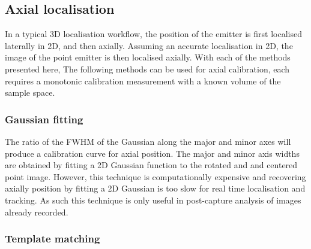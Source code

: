 \subsection{Axial localisation}

In a typical \gls{3D} localisation workflow, the position of the emitter is first localised laterally in \gls{2D}, and then axially.
Assuming an accurate localisation in 2D, the image of the point emitter is then localised axially.
With each of the methods presented here,
The following methods can be used for axial calibration, each requires a monotonic calibration measurement with a known volume of the sample space.

%

\subsubsection{Gaussian fitting}

The ratio of the \gls{FWHM} of the Gaussian along the major and minor axes will produce a calibration curve for axial position.
The major and minor axis widths are obtained by fitting a 2D Gaussian function to the rotated and and centered point image.
However, this technique is computationally expensive and recovering axially position by fitting a 2D Gaussian is too slow for real time localisation and tracking.
As such this technique is only useful in post-capture analysis of images already recorded.

\subsubsection{Template matching}

